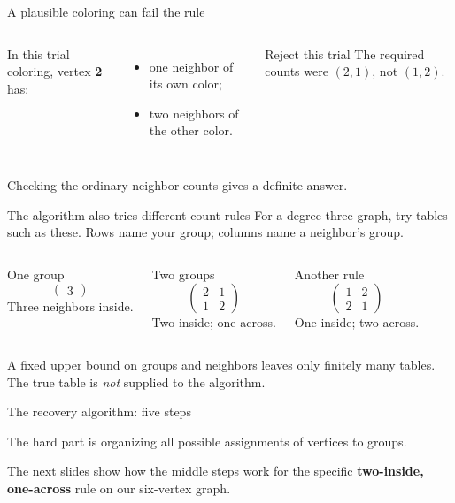 \begin{frame}{A plausible coloring can fail the rule}
\begin{columns}[c]
In this trial coloring, vertex \textbf{2} has:
\begin{itemize}
\item one neighbor of its own color;
\item two neighbors of the other color.
\end{itemize}
\begin{alertblock}{Reject this trial}
The required counts were $(2,1)$, not $(1,2)$.
\end{alertblock}
\end{columns}
Checking the ordinary neighbor counts gives a definite answer.
\end{frame}

\begin{frame}{The algorithm also tries different count rules}
For a degree-three graph, try tables such as these.
Rows name your group; columns name a neighbor's group.
\begin{columns}[t]
\begin{block}{One group}
\[
\begin{pmatrix}3\end{pmatrix}
\]
Three neighbors inside.
\end{block}
\begin{block}{Two groups}
\[
\begin{pmatrix}2&1\\1&2\end{pmatrix}
\]
Two inside; one across.
\end{block}
\begin{block}{Another rule}
\[
\begin{pmatrix}1&2\\2&1\end{pmatrix}
\]
One inside; two across.
\end{block}
\end{columns}
A fixed upper bound on groups and neighbors leaves only finitely many tables.
The true table is \emph{not} supplied to the algorithm.
\end{frame}

\begin{frame}{The recovery algorithm: five steps}
\begin{center}
\end{center}
The hard part is organizing all possible assignments of vertices to groups.

The next slides show how the middle steps work for the specific
\textbf{two-inside, one-across} rule on our six-vertex graph.
\end{frame}

